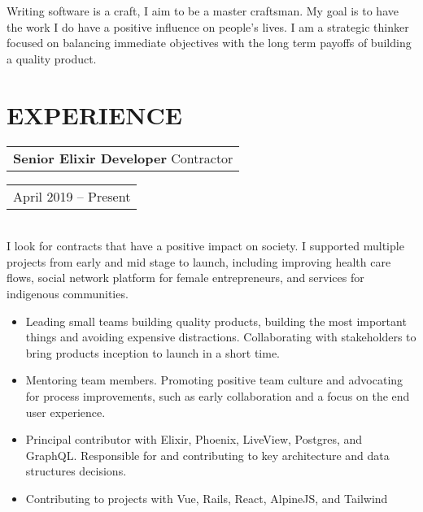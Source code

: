 \documentclass{resume}
\begin{document}

\address{\href{http://grahambaradoy.com}{grahambaradoy.com} \\ \href{https://www.github.com/baradoy}{github.com/baradoy}}
\address{ \href{mailto:graham@baradoy.ca}{graham@baradoy.ca} \\ 250-216-7112 }

\begin{resume}

\section{}
    Writing software is a craft, I aim to be a master craftsman.
    My goal is to have the work I do have a positive influence on people's lives.
    I am a strategic thinker focused on balancing immediate objectives with the long term payoffs of building a quality product.

\section{EXPERIENCE}

     \vspace{+0.1in}
    \begin{tabular}[t]{@{}l}
        {\bf Senior Elixir Developer} Contractor
    \end{tabular}\vspace{+0.05in}
    \hfill
    \begin{tabular}[t]{l@{}}
        April 2019 -- Present
    \end{tabular}\\
    I look for contracts that have a positive impact on society.
    I supported multiple projects from early and mid stage to launch, including improving health care flows, social network platform for female entrepreneurs, and services for indigenous communities.
    \vspace{+0.05in}
    \begin{itemize} \itemsep -2pt
    \item Leading small teams building quality products, building the most important things and avoiding expensive distractions. Collaborating with stakeholders to bring products inception to launch in a short time.
    \item Mentoring team members. Promoting positive team culture and advocating for process improvements, such as early collaboration and a focus on the end user experience.
    \item Principal contributor with Elixir, Phoenix, LiveView, Postgres, and GraphQL. Responsible for and contributing to key architecture and data structures decisions.
    \item Contributing to projects with Vue, Rails, React, AlpineJS, and Tailwind
    \end{itemize}



\end{resume}
\end{document}
